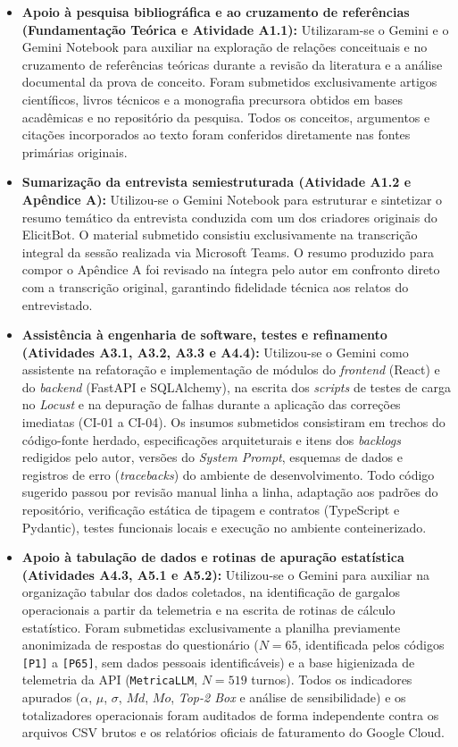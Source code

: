 \begin{itemize}
    \item \textbf{Apoio à pesquisa bibliográfica e ao cruzamento de referências (Fundamentação Teórica e Atividade A1.1):} Utilizaram-se o Gemini e o Gemini Notebook para auxiliar na exploração de relações conceituais e no cruzamento de referências teóricas durante a revisão da literatura e a análise documental da prova de conceito. Foram submetidos exclusivamente artigos científicos, livros técnicos e a monografia precursora obtidos em bases acadêmicas e no repositório da pesquisa. Todos os conceitos, argumentos e citações incorporados ao texto foram conferidos diretamente nas fontes primárias originais.
    \item \textbf{Sumarização da entrevista semiestruturada (Atividade A1.2 e Apêndice A):} Utilizou-se o Gemini Notebook para estruturar e sintetizar o resumo temático da entrevista conduzida com um dos criadores originais do ElicitBot. O material submetido consistiu exclusivamente na transcrição integral da sessão realizada via Microsoft Teams. O resumo produzido para compor o Apêndice A foi revisado na íntegra pelo autor em confronto direto com a transcrição original, garantindo fidelidade técnica aos relatos do entrevistado.
    \item \textbf{Assistência à engenharia de software, testes e refinamento (Atividades A3.1, A3.2, A3.3 e A4.4):} Utilizou-se o Gemini como assistente na refatoração e implementação de módulos do \textit{frontend} (React) e do \textit{backend} (FastAPI e SQLAlchemy), na escrita dos \textit{scripts} de testes de carga no \textit{Locust} e na depuração de falhas durante a aplicação das correções imediatas (CI-01 a CI-04). Os insumos submetidos consistiram em trechos do código-fonte herdado, especificações arquiteturais e itens dos \textit{backlogs} redigidos pelo autor, versões do \textit{System Prompt}, esquemas de dados e registros de erro (\textit{tracebacks}) do ambiente de desenvolvimento. Todo código sugerido passou por revisão manual linha a linha, adaptação aos padrões do repositório, verificação estática de tipagem e contratos (TypeScript e Pydantic), testes funcionais locais e execução no ambiente conteinerizado.
    \item \textbf{Apoio à tabulação de dados e rotinas de apuração estatística (Atividades A4.3, A5.1 e A5.2):} Utilizou-se o Gemini para auxiliar na organização tabular dos dados coletados, na identificação de gargalos operacionais a partir da telemetria e na escrita de rotinas de cálculo estatístico. Foram submetidas exclusivamente a planilha previamente anonimizada de respostas do questionário ($N = 65$, identificada pelos códigos \texttt{[P1]} a \texttt{[P65]}, sem dados pessoais identificáveis) e a base higienizada de telemetria da API (\texttt{MetricaLLM}, $N = 519$ turnos). Todos os indicadores apurados ($\alpha$, $\mu$, $\sigma$, $Md$, $Mo$, \textit{Top-2 Box} e análise de sensibilidade) e os totalizadores operacionais foram auditados de forma independente contra os arquivos CSV brutos e os relatórios oficiais de faturamento do Google Cloud.

\end{itemize}
